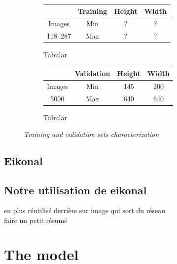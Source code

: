 \documentclass{article}
\begin{document}
\begin{figure}[!ht]
            \begin{subfigure}{.49\linewidth}
                \center
                \begin{tabular}{|c|c|c||c|}
                    \hline
                     & Training & Height & Width \\
                    \hline
                    \hline
                    Images & Min & ? & ? \\
                    \hline
                    118~287 & Max & ? & ? \\
                    \hline
                \end{tabular}
                \caption{Tabular}
            \end{subfigure}
            \begin{subfigure}{.49\linewidth}
                \center
                \begin{tabular}{|c||c|c|c|}
                    \hline
                     & Validation & Height & Width \\
                    \hline
                    \hline
                    Images & Min & 145 & 200 \\
                    \hline
                    5000 & Max & 640 & 640 \\
                    \hline
                \end{tabular}
                \caption{Tabular}
            \end{subfigure}
            \caption{\textit{Training and validation sets characterization}}
        \end{figure}

    \subsection{Eikonal}
    \subsection{Notre utilisation de eikonal}
    en plus réutilisé derrière sur image qui sort du réseau\\
    faire un petit résumé









\section{The model}
\end{document}
